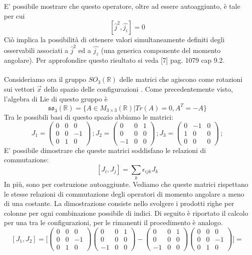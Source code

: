 \documentclass[12pt,a4paper]{report}
\theoremstyle{definition}
\theoremstyle{Theorem}
\theoremstyle{definition}
\theoremstyle{definition}
\theoremstyle{definition}
\begin{document}
E' possibile mostrare che questo operatore, oltre ad essere autoaggiunto, è tale per cui
$$[\hat{j}^2,\hat{j_i}]=0$$
Ciò implica la possibilità di ottenere valori simultaneamente definiti degli osservabili associati a $\hat{j}^2$ ed a $\hat{j_z}$ (una generica componente del momento angolare).
Per approfondire questo risultato si veda [7] pag. 1079 cap 9.2.\\
\\
Consideriamo ora il gruppo $SO_3(\mathbb{R})$ delle matrici che agiscono come rotazioni sui vettori  $\vec{x}$ dello spazio delle configurazioni . Come precedentemente visto, l'algebra di Lie di questo gruppo è
$$\mathfrak{so_3}(\mathbb{R})=\{A\in M_{3\times 3}(\mathbb{R})|Tr(A)=0, A^T=-A\}$$
Tra le possibili basi di questo spazio abbiamo le matrici:$$
J_1=
\begin{pmatrix}
	0 &0&0\\
	0 &0&-1\\
	0 &1&0
\end{pmatrix} \, ;
J_2=
\begin{pmatrix}
	0 &0&1\\
	0 &0&0\\
	-1 &0&0
\end{pmatrix} \, ;
J_3=
\begin{pmatrix}
	0 &-1&0\\
	1 &0&0\\
	0 &0&0
\end{pmatrix} \, ;
$$
E' possibile dimostrare che queste matrici soddisfano le relazioni di commutazione:
$$[J_i,J_j]=\sum_{k}\epsilon_{ijk}J_k$$
In più, sono per costruzione autoaggiunte.
Vediamo che queste matrici rispettano le stesse relazioni di commutazione degli operatori di momento angolare a meno di una costante.
La dimostrazione consiste nello svolgere i prodotti righe per colonne per ogni combinazione possibile di indici. Di seguito è riportato il calcolo per una tra le configurazioni, per le rimanenti il procedimento è analogo.
$$[J_1,J_2]=\bigg[
\begin{pmatrix}
	0 &0&0\\
	0 &0&-1\\
	0 &1&0
\end{pmatrix}
\begin{pmatrix}
	0 &0&1\\
	0 &0&0\\
	-1 &0&0
\end{pmatrix}
-
\begin{pmatrix}
	0 &0&1\\
	0 &0&0\\
	-1 &0&0
\end{pmatrix}
\begin{pmatrix}
	0 &0&0\\
	0 &0&-1\\
	0 &1&0
\end{pmatrix}
\bigg]=$$
\end{document}
